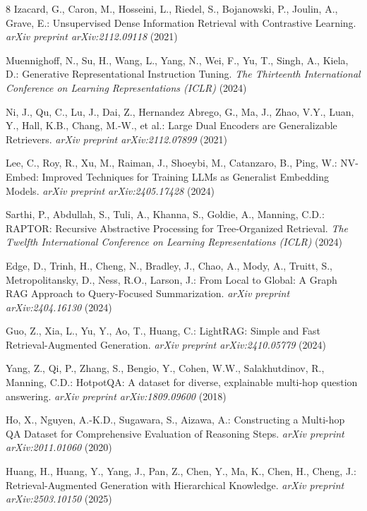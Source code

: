 \documentclass[runningheads]{llncs}
\begin{document}
\begin{thebibliography}{8}
Izacard, G., Caron, M., Hosseini, L., Riedel, S., Bojanowski, P., Joulin, A., Grave, E.:
Unsupervised Dense Information Retrieval with Contrastive Learning.
\textit{arXiv preprint arXiv:2112.09118} (2021)

Muennighoff, N., Su, H., Wang, L., Yang, N., Wei, F., Yu, T., Singh, A., Kiela, D.: Generative Representational Instruction Tuning.
\textit{The Thirteenth International Conference on Learning Representations (ICLR)} (2024)

Ni, J., Qu, C., Lu, J., Dai, Z., Hernandez Abrego, G., Ma, J., Zhao, V.Y., Luan, Y., Hall, K.B., Chang, M.-W., et al.: Large Dual Encoders are Generalizable Retrievers.
\textit{arXiv preprint arXiv:2112.07899} (2021)

Lee, C., Roy, R., Xu, M., Raiman, J., Shoeybi, M., Catanzaro, B., Ping, W.: NV-Embed: Improved Techniques for Training LLMs as Generalist Embedding Models.
\textit{arXiv preprint arXiv:2405.17428} (2024)

Sarthi, P., Abdullah, S., Tuli, A., Khanna, S., Goldie, A., Manning, C.D.:
RAPTOR: Recursive Abstractive Processing for Tree-Organized Retrieval.
\textit{The Twelfth International Conference on Learning Representations (ICLR)} (2024)

Edge, D., Trinh, H., Cheng, N., Bradley, J., Chao, A., Mody, A., Truitt, S., Metropolitansky, D., Ness, R.O., Larson, J.: From Local to Global: A Graph RAG Approach to Query-Focused Summarization.
\textit{arXiv preprint arXiv:2404.16130} (2024)

Guo, Z., Xia, L., Yu, Y., Ao, T., Huang, C.:
LightRAG: Simple and Fast Retrieval-Augmented Generation.
\textit{arXiv preprint arXiv:2410.05779} (2024)

Yang, Z., Qi, P., Zhang, S., Bengio, Y., Cohen, W.W., Salakhutdinov, R., Manning, C.D.:
HotpotQA: A dataset for diverse, explainable multi-hop question answering.
\textit{arXiv preprint arXiv:1809.09600} (2018)

Ho, X., Nguyen, A.-K.D., Sugawara, S., Aizawa, A.:
Constructing a Multi-hop QA Dataset for Comprehensive Evaluation of Reasoning Steps.
\textit{arXiv preprint arXiv:2011.01060} (2020)

Huang, H., Huang, Y., Yang, J., Pan, Z., Chen, Y., Ma, K., Chen, H., Cheng, J.:
Retrieval-Augmented Generation with Hierarchical Knowledge.
\textit{arXiv preprint arXiv:2503.10150} (2025)


\end{thebibliography}
\end{document}
